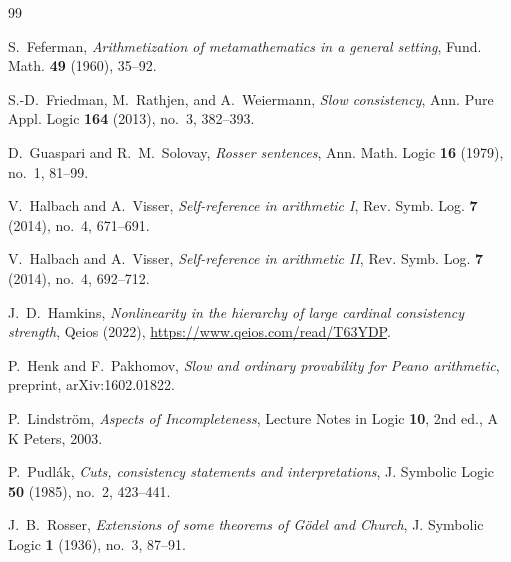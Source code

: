 \documentclass[11pt]{amsart}
\theoremstyle{definition}
\theoremstyle{remark}
\begin{document}
\begin{thebibliography}{99}

S.~Feferman,
\emph{Arithmetization of metamathematics in a general setting},
Fund. Math. \textbf{49} (1960), 35--92.

S.-D.~Friedman, M.~Rathjen, and A.~Weiermann,
\emph{Slow consistency},
Ann. Pure Appl. Logic \textbf{164} (2013), no.~3, 382--393.

D.~Guaspari and R.~M.~Solovay,
\emph{Rosser sentences},
Ann. Math. Logic \textbf{16} (1979), no.~1, 81--99.

V.~Halbach and A.~Visser,
\emph{Self-reference in arithmetic I},
Rev. Symb. Log. \textbf{7} (2014), no.~4, 671--691.

V.~Halbach and A.~Visser,
\emph{Self-reference in arithmetic II},
Rev. Symb. Log. \textbf{7} (2014), no.~4, 692--712.

J.~D.~Hamkins,
\emph{Nonlinearity in the hierarchy of large cardinal consistency
strength}, Qeios (2022), \url{https://www.qeios.com/read/T63YDP}.

P.~Henk and F.~Pakhomov,
\emph{Slow and ordinary provability for Peano arithmetic},
preprint, arXiv:1602.01822.

P.~Lindstr\"om,
\emph{Aspects of Incompleteness},
Lecture Notes in Logic \textbf{10}, 2nd ed., A K Peters, 2003.

P.~Pudl\'ak,
\emph{Cuts, consistency statements and interpretations},
J. Symbolic Logic \textbf{50} (1985), no.~2, 423--441.

J.~B.~Rosser,
\emph{Extensions of some theorems of G\"odel and Church},
J. Symbolic Logic \textbf{1} (1936), no.~3, 87--91.

\end{thebibliography}
\end{document}
